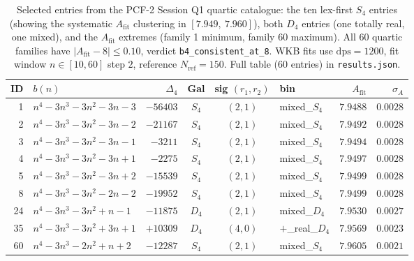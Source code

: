 \begin{table}[t]
\centering
\small
\begin{tabular}{rlrcclrr}
\hline
ID & $b(n)$ & $\Delta_4$ & Gal & sig $(r_1,r_2)$ & bin & $A_{\mathrm{fit}}$ & $\sigma_A$ \\
\hline
1  & $n^4-3n^3-3n^2-3n-3$    & $-56403$  & $S_4$ & $(2,1)$ & mixed\_$S_4$ & $7.9488$ & $0.0028$ \\
2  & $n^4-3n^3-3n^2-3n-2$    & $-21167$  & $S_4$ & $(2,1)$ & mixed\_$S_4$ & $7.9492$ & $0.0028$ \\
3  & $n^4-3n^3-3n^2-3n-1$    & $-3211$   & $S_4$ & $(2,1)$ & mixed\_$S_4$ & $7.9494$ & $0.0028$ \\
4  & $n^4-3n^3-3n^2-3n+1$    & $-2275$   & $S_4$ & $(2,1)$ & mixed\_$S_4$ & $7.9497$ & $0.0028$ \\
5  & $n^4-3n^3-3n^2-3n+2$    & $-15539$  & $S_4$ & $(2,1)$ & mixed\_$S_4$ & $7.9499$ & $0.0028$ \\
8  & $n^4-3n^3-3n^2-2n-2$    & $-19952$  & $S_4$ & $(2,1)$ & mixed\_$S_4$ & $7.9499$ & $0.0028$ \\
24 & $n^4-3n^3-3n^2+n-1$     & $-11875$  & $D_4$ & $(2,1)$ & mixed\_$D_4$ & $7.9530$ & $0.0027$ \\
35 & $n^4-3n^3-3n^2+3n+1$    & $+10309$  & $D_4$ & $(4,0)$ & $+$\_real\_$D_4$ & $7.9569$ & $0.0023$ \\
60 & $n^4-3n^3-2n^2+n+2$     & $-12287$  & $S_4$ & $(2,1)$ & mixed\_$S_4$ & $7.9605$ & $0.0021$ \\
\hline
\end{tabular}
\caption{Selected entries from the PCF-2 Session Q1 quartic catalogue:
the ten lex-first $S_4$ entries (showing the systematic $A_{\mathrm{fit}}$
clustering in $[7.949,\ 7.960]$), both $D_4$ entries (one totally real,
one mixed), and the $A_{\mathrm{fit}}$ extremes (family 1 minimum,
family 60 maximum). All 60 quartic families have $|A_{\mathrm{fit}}-8|
\le 0.10$, verdict \texttt{b4\_consistent\_at\_8}. WKB fits use
$\mathrm{dps}=1200$, fit window $n\in[10,60]$ step $2$, reference
$N_{\mathrm{ref}}=150$. Full table (60 entries) in \texttt{results.json}.}
\label{tab:quartic_q1_main}
\end{table}
